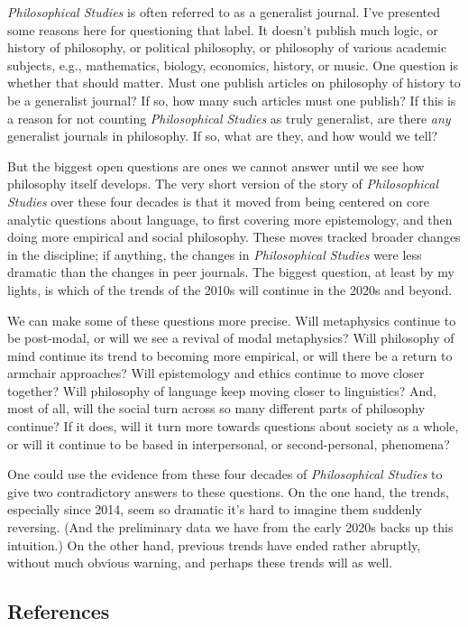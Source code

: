 \documentclass[
  11pt,
  letterpaper,
  DIV=11,
  numbers=noendperiod,
  twoside]{scrartcl}
\begin{document}
\emph{Philosophical Studies} is often referred to as a generalist
journal. I've presented some reasons here for questioning that label. It
doesn't publish much logic, or history of philosophy, or political
philosophy, or philosophy of various academic subjects, e.g.,
mathematics, biology, economics, history, or music. One question is
whether that should matter. Must one publish articles on philosophy of
history to be a generalist journal? If so, how many such articles must
one publish? If this is a reason for not counting \emph{Philosophical
Studies} as truly generalist, are there \emph{any} generalist journals
in philosophy. If so, what are they, and how would we tell?

But the biggest open questions are ones we cannot answer until we see
how philosophy itself develops. The very short version of the story of
\emph{Philosophical Studies} over these four decades is that it moved
from being centered on core analytic questions about language, to first
covering more epistemology, and then doing more empirical and social
philosophy. These moves tracked broader changes in the discipline; if
anything, the changes in \emph{Philosophical Studies} were less dramatic
than the changes in peer journals. The biggest question, at least by my
lights, is which of the trends of the 2010s will continue in the 2020s
and beyond.

We can make some of these questions more precise. Will metaphysics
continue to be post-modal, or will we see a revival of modal
metaphysics? Will philosophy of mind continue its trend to becoming more
empirical, or will there be a return to armchair approaches? Will
epistemology and ethics continue to move closer together? Will
philosophy of language keep moving closer to linguistics? And, most of
all, will the social turn across so many different parts of philosophy
continue? If it does, will it turn more towards questions about society
as a whole, or will it continue to be based in interpersonal, or
second-personal, phenomena?

One could use the evidence from these four decades of
\emph{Philosophical Studies} to give two contradictory answers to these
questions. On the one hand, the trends, especially since 2014, seem so
dramatic it's hard to imagine them suddenly reversing. (And the
preliminary data we have from the early 2020s backs up this intuition.)
On the other hand, previous trends have ended rather abruptly, without
much obvious warning, and perhaps these trends will as well.

\subsection*{References}\label{references}
\end{document}
